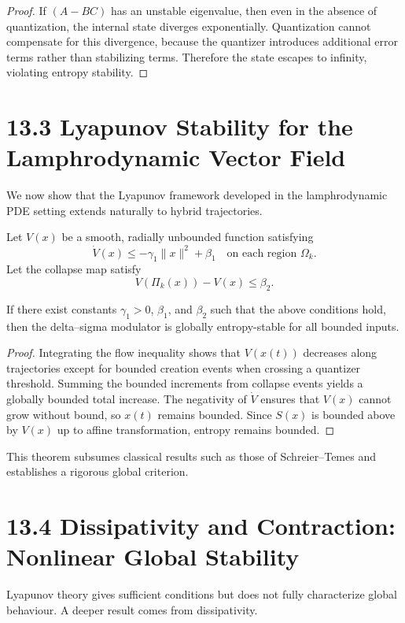 \begin{proof}
If $(A - BC)$ has an unstable eigenvalue, then even in the absence of quantization, the internal state diverges exponentially. Quantization cannot compensate for this divergence, because the quantizer introduces additional error terms rather than stabilizing terms. Therefore the state escapes to infinity, violating entropy stability.
\end{proof}

\section*{13.3 Lyapunov Stability for the Lamphrodynamic Vector Field}

We now show that the Lyapunov framework developed in the lamphrodynamic PDE setting extends naturally to hybrid trajectories.

Let $V(x)$ be a smooth, radially unbounded function satisfying
\[
\dot{V}(x) \le -\gamma_1 \| x \|^2 + \beta_1
\quad \text{on each region } \Omega_k.
\]
Let the collapse map satisfy
\[
V(\Pi_k(x)) - V(x) \le \beta_2.
\]

\begin{theorem}
If there exist constants $\gamma_1>0$, $\beta_1$, and $\beta_2$ such that the above conditions hold, then the delta--sigma modulator is globally entropy-stable for all bounded inputs.
\end{theorem}

\begin{proof}
Integrating the flow inequality shows that $V(x(t))$ decreases along trajectories except for bounded creation events when crossing a quantizer threshold. Summing the bounded increments from collapse events yields a globally bounded total increase. The negativity of $\dot{V}$ ensures that $V(x)$ cannot grow without bound, so $x(t)$ remains bounded. Since $S(x)$ is bounded above by $V(x)$ up to affine transformation, entropy remains bounded.
\end{proof}

This theorem subsumes classical results such as those of Schreier–Temes and establishes a rigorous global criterion.

\section*{13.4 Dissipativity and Contraction: Nonlinear Global Stability}

Lyapunov theory gives sufficient conditions but does not fully characterize global behaviour. A deeper result comes from dissipativity.

